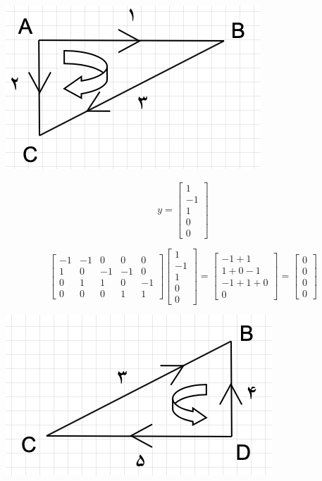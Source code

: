 \includegraphics{triangle.png}

$$ y = \begin{bmatrix}
1 \\ -1 \\ 1 \\ 0 \\ 0
\end{bmatrix} $$

$$ \begin{bmatrix}
-1 & -1 & 0 & 0 & 0 \\
1 & 0 & -1 & -1 & 0 \\
0 & 1 & 1 & 0 & -1 \\
0 & 0 & 0 & 1 & 1
\end{bmatrix} 
\begin{bmatrix}
1 \\ -1 \\ 1 \\ 0 \\ 0
\end{bmatrix}
=
\begin{bmatrix}
-1+1 \\ 1+0-1 \\ -1+1+0 \\ 0
\end{bmatrix}
=
\begin{bmatrix}
0 \\ 0 \\ 0 \\ 0
\end{bmatrix}
$$


\includegraphics{triangle2.png}

